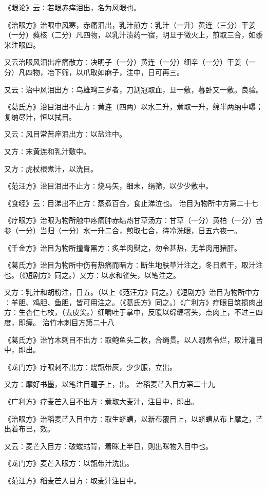 \documentclass[a4paper,12pt,UTF8,twoside]{ctexbook}
\begin{document}
《眼论》云∶若眼赤痒泪出，名为风眼也。

《治眼方》治眼中风寒，赤痛泪出，乳汁煎方∶乳汁（一升）黄连（三分）干姜（一分）蕤核（二分）凡四物，以乳汁渍药一宿，明旦于微火上，煎取三合，如黍米注眼四。

又云治眼风泪出痒痛散方∶决明子（一分）黄连（一分）细辛（一分）干姜（一分）凡四物，冶下筛，以爪取如麻子，注中，日可再三。

又云∶治中风泪出方∶乌雄鸡三岁者，刀割冠取血，旦一敷，暮卧又一敷。良验。

《葛氏方》治目泪出不止方∶黄连（四两）以水二升，煮取一升，绵半两纳中曝；复纳尽汁，恒以拭目。

又云∶风目常苦痒泪出方∶以盐注中。

又方∶末黄连和乳汁敷中。

又方∶虎杖根煮汁，以洗目。

《范汪方》治目泪出不止方∶烧马矢，细末，绢筛，以少少敷中。

《食经》云∶目涕出不止方∶蒸煮百合，食止涕泣也。
治目为物所中方第二十七

《疗眼方》治眼为物所触中疼痛肿赤结热甘草汤方∶甘草（一分）黄柏（一分）苦参（一分）当归（一分）水一升二合，煎取七合，待冷洗眼，日五六夜一。

《千金方》治目为物所撞青黑方∶炙羊肉熨之，勿令甚热，无羊肉用猪肝。

《葛氏方》治目为物所中伤有热痛而暗方∶断生地肤草汁注之，冬日煮干，取汁注也。（《短剧方》同之。）又方∶以水和雀矢，以笔注之。

又方∶乳汁和胡粉注，日五。（以上《范汪方》同之。）《短剧方》治目为物所中方∶羊胆、鸡胆、鱼胆，皆可用注之。（《葛氏方》同之。）《广利方》疗眼目筑损肉出方∶生杏仁七枚，（去皮尖。）细嚼吐于掌中，反暖以绵缠箸头，点肉上，不过三四度，即瘥。
治竹木刺目方第二十八

《葛氏方》治竹木刺目不出方∶取鲍鱼头二枚，合绳贯。以人溺煮令烂，取汁灌目中，即出。

《龙门方》疗眼刺不出方∶烧甑带灰，少少服，立出。

又方∶摩好书墨，以笔注目瞳子上，出。
治稻麦芒入目方第二十九

《广利方》疗麦芒入目不出方∶煮取大麦汁，注目中，即出。

《治眼方》治稻麦芒入目中方∶取生蛴螬，以新布覆目上，以蛴螬从布上摩之，芒出着布已，效。

又云∶麦芒入目方∶破蝼蛄背，着眯上半日，则出眯物入目中也。

《龙门方》麦芒入眼方∶以甑带汁洗出。

《范汪方》稻麦芒入目方∶取麦汁注目中。
\end{document}
